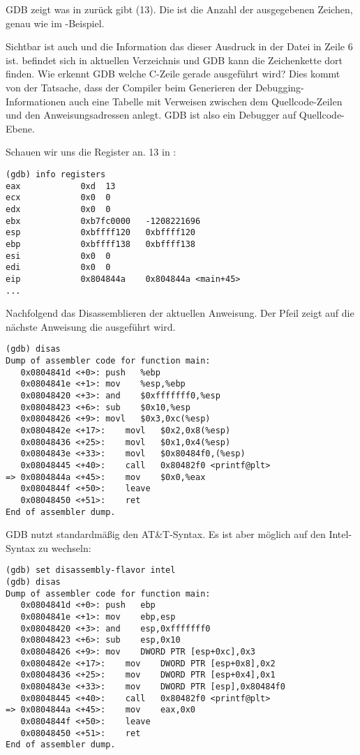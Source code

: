 \ac{GDB} zeigt was \printf in \EAX zurück gibt (13).
Die ist die Anzahl der ausgegebenen Zeichen, genau wie im \olly-Beispiel.

Sichtbar ist auch  und die Information das dieser Ausdruck in der Datei  in Zeile 6 ist.
 befindet sich in aktuellen Verzeichnis und \ac{GDB} kann die Zeichenkette dort finden.
Wie erkennt \ac{GDB} welche C-Zeile gerade ausgeführt wird?
Dies kommt von der Tatsache, dass der Compiler beim Generieren der Debugging-Informationen auch eine
Tabelle mit Verweisen zwischen dem Quellcode-Zeilen und den Anweisungsadressen anlegt.
GDB ist also ein Debugger auf Quellcode-Ebene.

Schauen wir uns die Register an.
13 in \EAX:

\begin{lstlisting}
(gdb) info registers
eax            0xd	13
ecx            0x0	0
edx            0x0	0
ebx            0xb7fc0000	-1208221696
esp            0xbffff120	0xbffff120
ebp            0xbffff138	0xbffff138
esi            0x0	0
edi            0x0	0
eip            0x804844a	0x804844a <main+45>
...
\end{lstlisting}

Nachfolgend das Disassemblieren der aktuellen Anweisung.
Der Pfeil zeigt auf die nächste Anweisung die ausgeführt wird.

\begin{lstlisting}
(gdb) disas
Dump of assembler code for function main:
   0x0804841d <+0>:	push   %ebp
   0x0804841e <+1>:	mov    %esp,%ebp
   0x08048420 <+3>:	and    $0xfffffff0,%esp
   0x08048423 <+6>:	sub    $0x10,%esp
   0x08048426 <+9>:	movl   $0x3,0xc(%esp)
   0x0804842e <+17>:	movl   $0x2,0x8(%esp)
   0x08048436 <+25>:	movl   $0x1,0x4(%esp)
   0x0804843e <+33>:	movl   $0x80484f0,(%esp)
   0x08048445 <+40>:	call   0x80482f0 <printf@plt>
=> 0x0804844a <+45>:	mov    $0x0,%eax
   0x0804844f <+50>:	leave  
   0x08048450 <+51>:	ret    
End of assembler dump.
\end{lstlisting}

\ac{GDB} nutzt standardmäßig den AT\&T-Syntax.
Es ist aber möglich auf den Intel-Syntax zu wechseln:

\begin{lstlisting}
(gdb) set disassembly-flavor intel
(gdb) disas
Dump of assembler code for function main:
   0x0804841d <+0>:	push   ebp
   0x0804841e <+1>:	mov    ebp,esp
   0x08048420 <+3>:	and    esp,0xfffffff0
   0x08048423 <+6>:	sub    esp,0x10
   0x08048426 <+9>:	mov    DWORD PTR [esp+0xc],0x3
   0x0804842e <+17>:	mov    DWORD PTR [esp+0x8],0x2
   0x08048436 <+25>:	mov    DWORD PTR [esp+0x4],0x1
   0x0804843e <+33>:	mov    DWORD PTR [esp],0x80484f0
   0x08048445 <+40>:	call   0x80482f0 <printf@plt>
=> 0x0804844a <+45>:	mov    eax,0x0
   0x0804844f <+50>:	leave  
   0x08048450 <+51>:	ret    
End of assembler dump.
\end{lstlisting}

